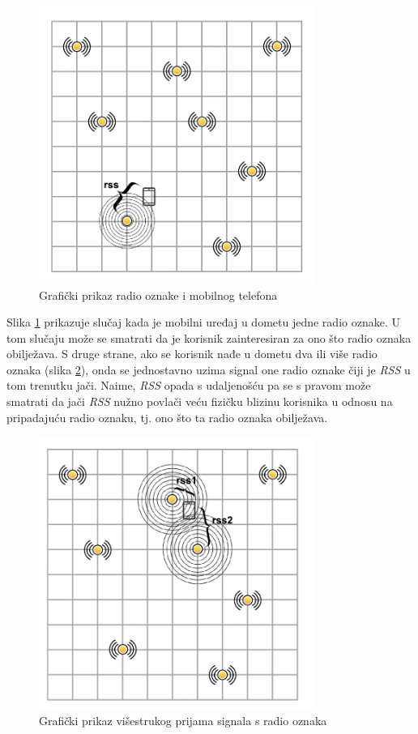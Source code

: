 \documentclass[times, utf8, diplomski, numeric]{fer}
\begin{document}
\begin{figure}[htb]
	\centering
	\includegraphics[width=9cm]{images/gridbeacons1cell.png}
	\caption{Grafički prikaz radio oznake i mobilnog telefona}
	\label{fig:RssOneCell}
\end{figure}

Slika \ref{fig:RssOneCell} prikazuje slučaj kada je mobilni
uređaj u dometu jedne radio oznake. U tom slučaju može se smatrati da je
korisnik zainteresiran za ono što radio oznaka obilježava. S druge strane,
ako se korisnik nađe u dometu dva ili više radio oznaka (slika
\ref{fig:RssTwoCells}), onda se jednostavno uzima signal one radio oznake čiji
je \emph{RSS} u tom trenutku jači. Naime, \emph{RSS} opada s udaljenošću pa se s
pravom može smatrati da jači \emph{RSS} nužno povlači veću fizičku blizinu
korisnika u odnosu na pripadajuću radio oznaku, tj. ono što ta radio oznaka
obilježava.

\begin{figure}[htb]
	\centering
	\includegraphics[width=9cm]{images/gridbeacons2cells.png}
	\caption{Grafički prikaz višestrukog prijama signala s radio oznaka}
	\label{fig:RssTwoCells}
\end{figure}
\end{document}

